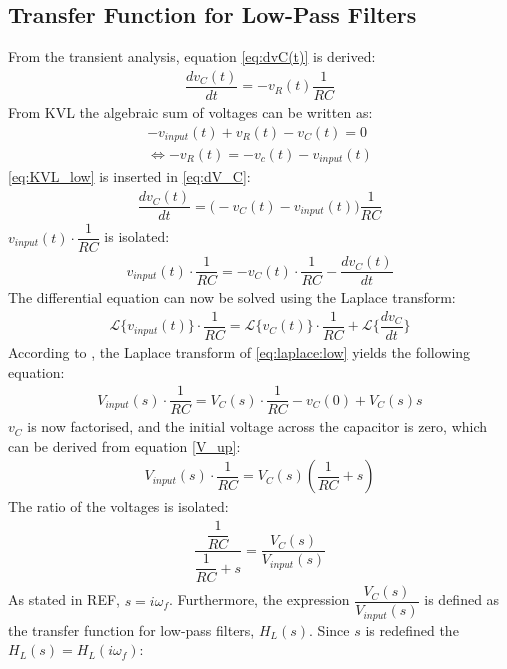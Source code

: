 \subsection{Transfer Function for Low-Pass Filters}
From the transient analysis, equation \eqref{eq:dvC(t)} is derived:
\begin{align} \label{eq:dV_C}
\dfrac{dv_C(t)}{dt}=-v_R(t)\dfrac{1}{RC}
\end{align}
From KVL the algebraic sum of voltages can be written as: 
\begin{align}
-v_{input}(t)+v_{R}(t)-v_{C}(t)=0
\\
\Leftrightarrow -v_{R}(t) = -v_{c}(t) - v_{input}(t) \label{eq:KVL_low}
\end{align}
\eqref{eq:KVL_low} is inserted in \eqref{eq:dV_C}:
\begin{align} 
\dfrac{dv_C(t)}{dt}=\Big(-v_C(t) - v_{input}(t)\Big)\dfrac{1}{RC}
\end{align}
 $v_{input}(t) \cdot \dfrac{1}{RC}$ is isolated:
\begin{align}
v_{input}(t) \cdot \dfrac{1}{RC}= - v_C(t) \cdot \dfrac{1}{RC} - \dfrac{dv_C(t)}{dt}
\end{align}
The differential equation can now be solved using the Laplace transform:
\begin{align}\label{eq:laplace:low}
\mathcal{L}\Big\{v_{input}(t)\Big\} \cdot \dfrac{1}{RC}=\mathcal{L}\Big\{v_C(t)\Big\} \cdot \dfrac{1}{RC}+\mathcal{L}\bigg\{\dfrac{dv_C}{dt}\bigg\}
\end{align}
According to , the Laplace transform of \eqref{eq:laplace:low} yields the following equation:
\begin{align}
V_{input}(s) \cdot \dfrac{1}{RC}=V_{C}(s) \cdot \dfrac{1}{RC} -v_{C}(0)+V_{C}(s)s
\end{align} 
$v_{C}$ is now factorised, and the initial voltage across the capacitor is zero, which can be derived from equation \eqref{V_up}:
\begin{align}
V_{input}(s) \cdot \dfrac{1}{RC}=V_{C}(s) \left( \dfrac{1}{RC} +s \right)
\end{align} 
The ratio of the voltages is isolated:
\begin{align}
\dfrac{\dfrac{1}{RC}}{\dfrac{1}{RC}+s} = \dfrac{V_{C}(s)}{V_{input}(s)}
\end{align} 
As stated in REF, $s=i \omega_f$. Furthermore, the expression $\dfrac{V_{C}(s)}{V_{input}(s)}$ is defined as the transfer function for low-pass filters, $H_{L}(s)$. Since $s$ is redefined the $H_{L}(s)=H_{L}(i \omega_f)$:
